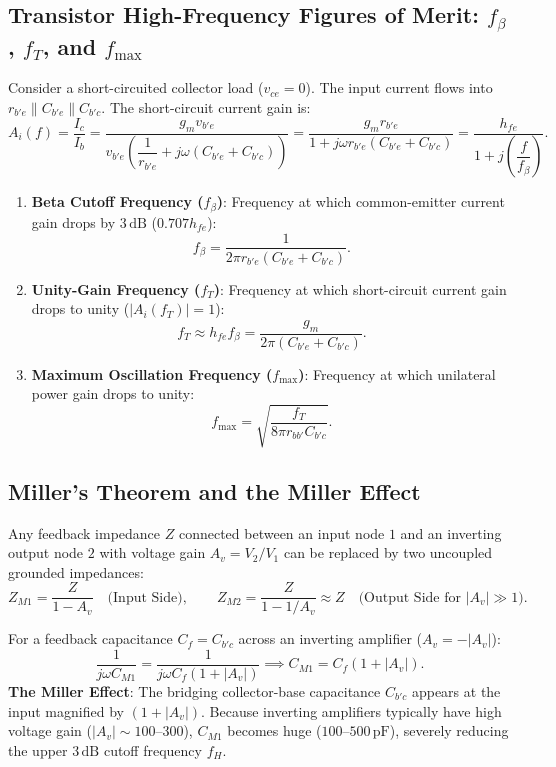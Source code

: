 \documentclass[12pt,a4paper]{article}
\begin{document}
\subsection{Transistor High-Frequency Figures of Merit: \texorpdfstring{$f_\beta$, $f_T$, and $f_{\max}$}{f_beta, f_T, and f_max}}
Consider a short-circuited collector load ($v_{ce} = 0$). The input current flows into $r_{b'e} \parallel C_{b'e} \parallel C_{b'c}$. The short-circuit current gain is:
\[
A_i(f) = \frac{I_c}{I_b} = \frac{g_m v_{b'e}}{v_{b'e}\left(\dfrac{1}{r_{b'e}} + j\omega (C_{b'e} + C_{b'c})\right)} = \frac{g_m r_{b'e}}{1 + j\omega r_{b'e}(C_{b'e} + C_{b'c})} = \frac{h_{fe}}{1 + j\left(\dfrac{f}{f_\beta}\right)}.
\]

\begin{tcolorbox}[formulabox, title={Cutoff and Unity-Gain Frequencies}]
\begin{enumerate}[leftmargin=1.5em, itemsep=2pt]
  \item \textbf{Beta Cutoff Frequency ($f_\beta$)}: Frequency at which common-emitter current gain drops by $3\,\mathrm{dB}$ ($0.707 h_{fe}$):
  \[
  f_\beta = \frac{1}{2\pi r_{b'e}(C_{b'e} + C_{b'c})}.
  \]
  \item \textbf{Unity-Gain Frequency ($f_T$)}: Frequency at which short-circuit current gain drops to unity ($|A_i(f_T)| = 1$):
  \[
  f_T \approx h_{fe} f_\beta = \frac{g_m}{2\pi (C_{b'e} + C_{b'c})}.
  \]
  \item \textbf{Maximum Oscillation Frequency ($f_{\max}$)}: Frequency at which unilateral power gain drops to unity:
  \[
  f_{\max} = \sqrt{\frac{f_T}{8\pi r_{bb'} C_{b'c}}}.
  \]
\end{enumerate}
\end{tcolorbox}

\subsection{Miller's Theorem and the Miller Effect}
\begin{tcolorbox}[defbox, title={Miller's Theorem}]
Any feedback impedance $Z$ connected between an input node $1$ and an inverting output node $2$ with voltage gain $A_v = V_2/V_1$ can be replaced by two uncoupled grounded impedances:
\[
Z_{M1} = \frac{Z}{1 - A_v}\quad\text{(Input Side)},\qquad
Z_{M2} = \frac{Z}{1 - 1/A_v} \approx Z\quad\text{(Output Side for } |A_v| \gg 1\text{)}.
\]
\end{tcolorbox}

For a feedback capacitance $C_f = C_{b'c}$ across an inverting amplifier ($A_v = -|A_v|$):
\[
\frac{1}{j\omega C_{M1}} = \frac{1}{j\omega C_f(1 + |A_v|)} \implies C_{M1} = C_f(1 + |A_v|).
\]
\textbf{The Miller Effect}: The bridging collector-base capacitance $C_{b'c}$ appears at the input magnified by $(1 + |A_v|)$. Because inverting amplifiers typically have high voltage gain ($|A_v| \sim 100$--$300$), $C_{M1}$ becomes huge ($100$--$500\,\mathrm{pF}$), severely reducing the upper $3\,\mathrm{dB}$ cutoff frequency $f_H$.
\end{document}
